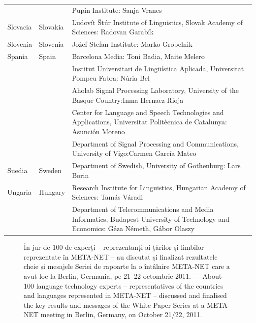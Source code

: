 \begin{longtable}{@{}llp{113mm}@{}}
  & & Pupin Institute: Sanja Vranes \\ \addlinespace  
  Slovacia & \textcolor{grey1}{Slovakia} & Ľudovít Štúr Institute of Linguistics, Slovak Academy of Sciences: Radovan Garabík \\ \addlinespace 
  Slovenia & \textcolor{grey1}{Slovenia} & Jožef Stefan Institute: Marko Grobelnik \\ \addlinespace 
  Spania & \textcolor{grey1}{Spain} & Barcelona Media: Toni Badia, Maite Melero \\ \addlinespace 
  & & Institut Universitari de Lingüística Aplicada, Universitat Pompeu Fabra: Núria Bel \\ \addlinespace 
  & & Aholab Signal Processing Laboratory, University of the Basque Country:\newline Inma Hernaez Rioja \\ \addlinespace 
  & & Center for Language and Speech Technologies and Applications, Universitat Politècnica de Catalunya:  Asunción Moreno \\ \addlinespace 
  & & Department of Signal Processing and Communications, University of Vigo:\newline Carmen García Mateo \\ \addlinespace 
  Suedia & \textcolor{grey1}{Sweden} & Department of Swedish, University of Gothenburg: Lars Borin \\ \addlinespace 
  Ungaria & \textcolor{grey1}{Hungary} & Research Institute for Linguistics, Hungarian Academy of Sciences: Tamás Váradi\\  \addlinespace
  & & Department of Telecommunications and Media Informatics, Budapest University of Technology and Economics: Géza Németh, Gábor Olaszy
\end{longtable}
\normalsize

\renewcommand*{\figureformat}{}
\renewcommand*{\captionformat}{}

\begin{figure}[htbp]
  \center
  \caption{În jur de 100 de experți -- reprezentanți ai țărilor și limbilor reprezentate în META-NET -- au discutat și finalizat rezultatele cheie și mesajele Seriei de rapoarte la o întâlnire META-NET care a avut loc la Berlin, Germania, pe 21--22 octombrie 2011. --- \textcolor{grey1}{About 100 language technology experts -- representatives of the countries and languages represented in META-NET -- discussed and finalised the key results and messages of the White Paper Series at a META-NET meeting in Berlin, Germany, on October 21/22, 2011.}}
\end{figure}

